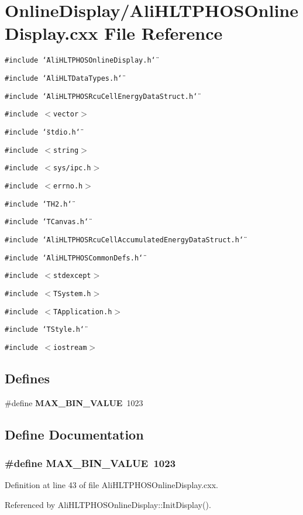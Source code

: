 \section{Online\-Display/Ali\-HLTPHOSOnline\-Display.cxx File Reference}
\label{AliHLTPHOSOnlineDisplay_8cxx}


{\tt \#include \char`\"{}Ali\-HLTPHOSOnline\-Display.h\char`\"{}}\par
{\tt \#include \char`\"{}Ali\-HLTData\-Types.h\char`\"{}}\par
{\tt \#include \char`\"{}Ali\-HLTPHOSRcu\-Cell\-Energy\-Data\-Struct.h\char`\"{}}\par
{\tt \#include $<$vector$>$}\par
{\tt \#include \char`\"{}stdio.h\char`\"{}}\par
{\tt \#include $<$string$>$}\par
{\tt \#include $<$sys/ipc.h$>$}\par
{\tt \#include $<$errno.h$>$}\par
{\tt \#include \char`\"{}TH2.h\char`\"{}}\par
{\tt \#include \char`\"{}TCanvas.h\char`\"{}}\par
{\tt \#include \char`\"{}Ali\-HLTPHOSRcu\-Cell\-Accumulated\-Energy\-Data\-Struct.h\char`\"{}}\par
{\tt \#include \char`\"{}Ali\-HLTPHOSCommon\-Defs.h\char`\"{}}\par
{\tt \#include $<$stdexcept$>$}\par
{\tt \#include $<$TSystem.h$>$}\par
{\tt \#include $<$TApplication.h$>$}\par
{\tt \#include \char`\"{}TStyle.h\char`\"{}}\par
{\tt \#include $<$iostream$>$}\par
\subsection*{Defines}
\begin{CompactItemize}
\item 
\#define {\bf MAX\_\-BIN\_\-VALUE}\ 1023
\end{CompactItemize}


\subsection{Define Documentation}
\subsubsection{\setlength{\rightskip}{0pt plus 5cm}\#define MAX\_\-BIN\_\-VALUE\ 1023}\label{AliHLTPHOSOnlineDisplay_8cxx_a0}




Definition at line 43 of file Ali\-HLTPHOSOnline\-Display.cxx.

Referenced by Ali\-HLTPHOSOnline\-Display::Init\-Display().